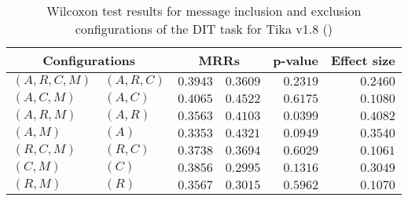 
\begin{table}
\begin{spacing}{1.2}
\centering
\caption{Wilcoxon test results for message inclusion and exclusion configurations of the DIT task for Tika v1.8 (\ctwo)}
\label{table:versus-wilcox-tika-dit-message}
\begin{tabular}{ll|rr|rr}
\toprule
      \multicolumn{2}{c|}{Configurations} &                \multicolumn{2}{c|}{MRRs} &             p-value & Effect size \\
\midrule
 $(A,R,C,M)$ &  $(A,R,C)$ &  $\bm{0.3943}$ &       $0.3609$ & $0.2319$ &    $0.2460$ \\
   $(A,C,M)$ &    $(A,C)$ &       $0.4065$ &  $\bm{0.4522}$ & $0.6175$ &    $0.1080$ \\
   $(A,R,M)$ &    $(A,R)$ &       $0.3563$ &  $\bm{0.4103}$ & $0.0399$ &    $0.4082$ \\
     $(A,M)$ &      $(A)$ &       $0.3353$ &  $\bm{0.4321}$ & $0.0949$ &    $0.3540$ \\
   $(R,C,M)$ &    $(R,C)$ &  $\bm{0.3738}$ &       $0.3694$ & $0.6029$ &    $0.1061$ \\
     $(C,M)$ &      $(C)$ &  $\bm{0.3856}$ &       $0.2995$ & $0.1316$ &    $0.3049$ \\
     $(R,M)$ &      $(R)$ &  $\bm{0.3567}$ &       $0.3015$ & $0.5962$ &    $0.1070$ \\
\bottomrule
\end{tabular}

\end{spacing}
\end{table}

